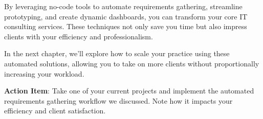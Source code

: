 By leveraging no-code tools to automate requirements gathering, streamline prototyping, and create dynamic dashboards, you can transform your core IT consulting services. These techniques not only save you time but also impress clients with your efficiency and professionalism.

In the next chapter, we'll explore how to scale your practice using these automated solutions, allowing you to take on more clients without proportionally increasing your workload.

\textbf{Action Item}: Take one of your current projects and implement the automated requirements gathering workflow we discussed. Note how it impacts your efficiency and client satisfaction.

